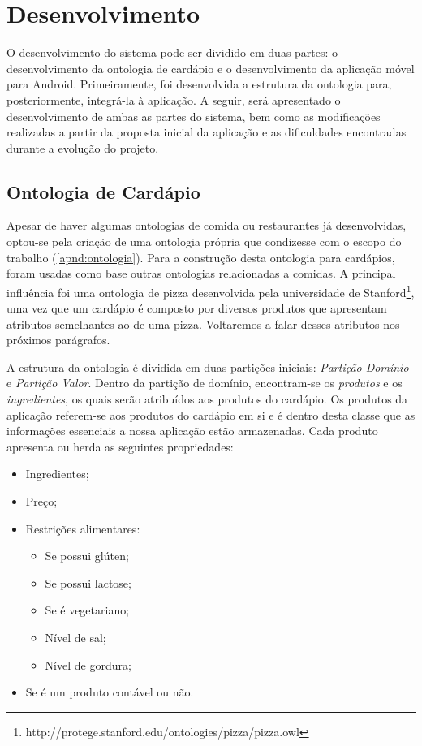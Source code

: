 
\chapter{\label{chap:desenvolvimento}Desenvolvimento}

O desenvolvimento do sistema pode ser dividido em duas partes: o desenvolvimento da ontologia de cardápio e o desenvolvimento da aplicação móvel para Android. Primeiramente, foi desenvolvida a estrutura da ontologia para, posteriormente, integrá-la à aplicação. A seguir, será apresentado o desenvolvimento de ambas as partes do sistema, bem como as modificações realizadas a partir da proposta inicial da aplicação e as dificuldades encontradas durante a evolução do projeto.

\section{Ontologia de Cardápio}

Apesar de haver algumas ontologias de comida ou restaurantes já desenvolvidas, optou-se pela criação de uma ontologia própria que condizesse com o escopo do trabalho (\ref{apnd:ontologia}). Para a construção desta ontologia para cardápios, foram usadas como base outras ontologias relacionadas a comidas. A principal influência foi uma ontologia de pizza desenvolvida pela universidade de Stanford\footnote{http://protege.stanford.edu/ontologies/pizza/pizza.owl}, uma vez que um cardápio é composto por diversos produtos que apresentam atributos semelhantes ao de uma pizza. Voltaremos a falar desses atributos nos próximos parágrafos.

A estrutura da ontologia é dividida em duas partições iniciais: \emph{Partição Domínio} e \emph{Partição Valor}. Dentro da partição de domínio, encontram-se os \emph{produtos} e os \emph{ingredientes}, os quais serão atribuídos aos produtos do cardápio. Os produtos da aplicação referem-se aos produtos do cardápio em si e é dentro desta classe que as informações essenciais a nossa aplicação estão armazenadas. Cada produto apresenta ou herda as seguintes propriedades:
\begin{itemize}
	\item Ingredientes;
	\item Preço;
	\item Restrições alimentares:
	\begin{itemize}
		\item Se possui glúten;
		\item Se possui lactose;
		\item Se é vegetariano;
		\item Nível de sal;
		\item Nível de gordura;
	\end{itemize}
	\item Se é um produto contável ou não.
\end{itemize}

